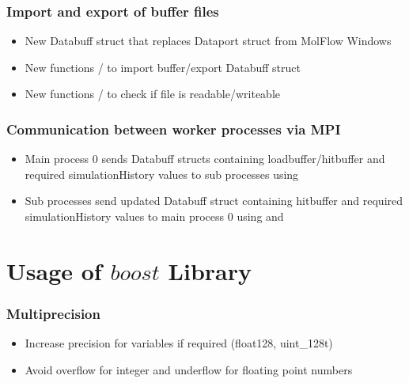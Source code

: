\subsubsection{Import and export of buffer files}
\begin{itemize}[noitemsep,topsep=0pt, partopsep=0pt]
\item New Databuff struct that replaces Dataport struct from MolFlow Windows
\end{itemize}
\begin{itemize}[noitemsep,topsep=0pt, partopsep=0pt]
\item New functions / to import buffer/export Databuff struct
\item New functions / to check if file is readable/writeable
\end{itemize}

\subsubsection{Communication between worker processes via MPI}
\begin{itemize}[noitemsep,topsep=0pt, partopsep=0pt]
\item Main process 0 sends Databuff structs containing loadbuffer/hitbuffer and required simulationHistory values to sub processes using 
\item Sub processes send updated Databuff struct containing hitbuffer and required simulationHistory values to main process 0 using  and 
\end{itemize}

\section{Usage of $boost$ Library}
\subsubsection{Multiprecision}
\begin{itemize}[noitemsep,topsep=0pt, partopsep=0pt]
\item Increase precision for variables if required (float128, uint\_128t)
\item Avoid overflow for integer and underflow for floating point numbers
\end{itemize}
\newpage
